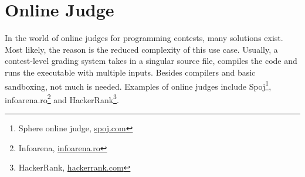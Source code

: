 \section{Online Judge}
\label{sec:judge}

In the world of online judges for programming contests, many solutions exist. Most likely, the reason is the reduced complexity of this use case. Usually, a contest-level grading system takes in a singular source file, compiles the code and runs the executable with multiple inputs. Besides compilers and basic sandboxing, not much is needed. Examples of online judges include Spoj\footnote{Sphere online judge, \url{spoj.com}}, infoarena.ro\footnote{Infoarena, \url{infoarena.ro}} and HackerRank\footnote{HackerRank, \url{hackerrank.com}}.

